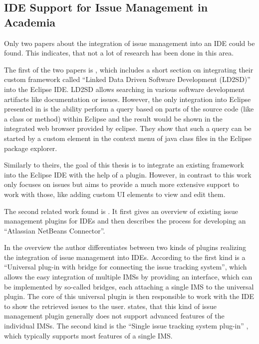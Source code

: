 \subsection{\gls{IDE} Support for Issue Management in Academia} 
\label{ssec:ch2:ss2.2}
Only two papers about the integration of issue management into an \gls{IDE} could be found.
This indicates, that not a lot of research has been done in this area.

The first of the two papers is \cite{iqbal2009integrating},
which includes a short section on integrating their custom framework called ``Linked Data Driven Software Development (LD2SD)'' 
into the \gls{Eclipse} \gls{IDE}.
LD2SD allows searching in various software development artifacts like documentation or issues.
However, the only integration into \gls{Eclipse} presented in \cite{iqbal2009integrating} is the ability perform a query based on 
parts of the source code (like a class or method) within \gls{Eclipse} and the result would be shown in the integrated web browser provided by eclipse.
They show that such a query can be started by a custom element in the context menu of \gls{java} class files in the \gls{Eclipse} package explorer.

Similarly to theirs, the goal of this thesis is to integrate an existing framework into the \gls{Eclipse} \gls{IDE} with the help of a plugin.
However, in contrast to \cite{iqbal2009integrating} this work only focuses on issues but aims to provide a much more extensive support to work with those, like adding custom \gls{UI} elements to view and edit them.

The second related work found is \cite{janak2009issue}.
It first gives an overview of existing issue management plugins for \glspl{IDE} and then describes the process for developing an ``Atlassian NetBeans Connector''.

In the overview the author differentiates between two kinds of plugins realizing the integration of issue management into \glspl{IDE}.
According to \cite{janak2009issue} the first kind is a ``Universal plug-in with bridge for connecting the issue tracking system'',
which allows the easy integration of multiple \glspl{IMS} by providing an interface, which can be implemented by so-called bridges, 
each attaching a single \gls{IMS} to the universal plugin.
The core of this universal plugin is then responsible to work with the \gls{IDE} to show the retrieved issues to the user.
\Cite{janak2009issue} states, that this kind of issue management plugin generally does not support advanced features of the individual \glspl{IMS}.
The second kind is the ``Single issue tracking system plug-in'' \cite{janak2009issue}, which typically supports most features of a single \gls{IMS}.

